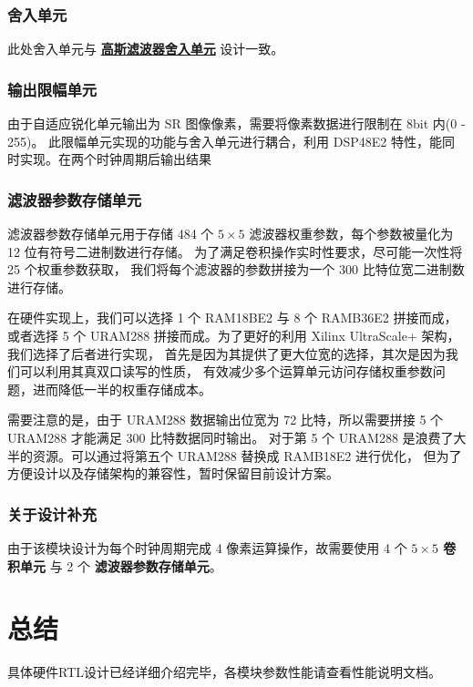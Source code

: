 \documentclass[12pt, a4paper, oneside]{ctexbook}
\begin{document}
	\subsection{舍入单元}
	此处舍入单元与 \hyperref[round_unit]{\textbf{高斯滤波器舍入单元}} 设计一致。		
	\subsection{输出限幅单元}
	由于自适应锐化单元输出为 SR 图像像素，需要将像素数据进行限制在 8bit 内(0 - 255)。
	此限幅单元实现的功能与舍入单元进行耦合，利用 DSP48E2 特性，能同时实现。在两个时钟周期后输出结果
	\subsection{滤波器参数存储单元}
	滤波器参数存储单元用于存储 484 个 $5\times5$ 滤波器权重参数，每个参数被量化为 12 位有符号二进制数进行存储。
	为了满足卷积操作实时性要求，尽可能一次性将 25 个权重参数获取，
	我们将每个滤波器的参数拼接为一个 300 比特位宽二进制数进行存储。
	\par 在硬件实现上，我们可以选择 1 个 RAM18BE2 与 8 个 RAMB36E2 拼接而成，
	或者选择 5 个 URAM288 拼接而成。为了更好的利用 Xilinx UltraScale+ 架构，我们选择了后者进行实现，
	首先是因为其提供了更大位宽的选择，其次是因为我们可以利用其真双口读写的性质，
	有效减少多个运算单元访问存储权重参数问题，进而降低一半的权重存储成本。
	\par 需要注意的是，由于 URAM288 数据输出位宽为 72 比特，所以需要拼接 5 个 URAM288 才能满足 300 比特数据同时输出。
	对于第 5 个 URAM288 是浪费了大半的资源。可以通过将第五个 URAM288 替换成 RAMB18E2 进行优化，
	但为了方便设计以及存储架构的兼容性，暂时保留目前设计方案。
	\subsection{关于设计补充} 
	由于该模块设计为每个时钟周期完成 4 像素运算操作，故需要使用 4 个 \textbf{ $5\times5$ 卷积单元} 与 2 个 \textbf{滤波器参数存储单元}。
	
	\chapter{总结}
	具体硬件RTL设计已经详细介绍完毕，各模块参数性能请查看性能说明文档。
	
\end{document}

